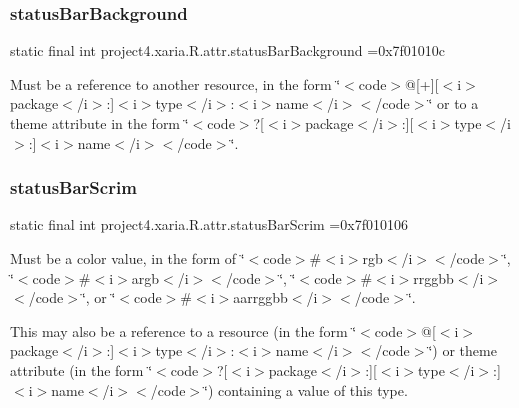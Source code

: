\subsubsection{\texorpdfstring{status\+Bar\+Background}{statusBarBackground}}
{\footnotesize\ttfamily static final int project4.\+xaria.\+R.\+attr.\+status\+Bar\+Background =0x7f01010c\hspace{0.3cm}{\ttfamily [static]}}

Must be a reference to another resource, in the form \char`\"{}$<$code$>$@\mbox{[}+\mbox{]}\mbox{[}$<$i$>$package$<$/i$>$\+:\mbox{]}$<$i$>$type$<$/i$>$\+:$<$i$>$name$<$/i$>$$<$/code$>$\char`\"{} or to a theme attribute in the form \char`\"{}$<$code$>$?\mbox{[}$<$i$>$package$<$/i$>$\+:\mbox{]}\mbox{[}$<$i$>$type$<$/i$>$\+:\mbox{]}$<$i$>$name$<$/i$>$$<$/code$>$\char`\"{}. \mbox{\label{classproject4_1_1xaria_1_1R_1_1attr_a758289560ae42afd69011d542f163e80}} 
\subsubsection{\texorpdfstring{status\+Bar\+Scrim}{statusBarScrim}}
{\footnotesize\ttfamily static final int project4.\+xaria.\+R.\+attr.\+status\+Bar\+Scrim =0x7f010106\hspace{0.3cm}{\ttfamily [static]}}

Must be a color value, in the form of \char`\"{}$<$code$>$\#$<$i$>$rgb$<$/i$>$$<$/code$>$\char`\"{}, \char`\"{}$<$code$>$\#$<$i$>$argb$<$/i$>$$<$/code$>$\char`\"{}, \char`\"{}$<$code$>$\#$<$i$>$rrggbb$<$/i$>$$<$/code$>$\char`\"{}, or \char`\"{}$<$code$>$\#$<$i$>$aarrggbb$<$/i$>$$<$/code$>$\char`\"{}. 

This may also be a reference to a resource (in the form \char`\"{}$<$code$>$@\mbox{[}$<$i$>$package$<$/i$>$\+:\mbox{]}$<$i$>$type$<$/i$>$\+:$<$i$>$name$<$/i$>$$<$/code$>$\char`\"{}) or theme attribute (in the form \char`\"{}$<$code$>$?\mbox{[}$<$i$>$package$<$/i$>$\+:\mbox{]}\mbox{[}$<$i$>$type$<$/i$>$\+:\mbox{]}$<$i$>$name$<$/i$>$$<$/code$>$\char`\"{}) containing a value of this type. \mbox{\label{classproject4_1_1xaria_1_1R_1_1attr_a9b0e755b1af717c09653bfc7dcbfe443}} 
